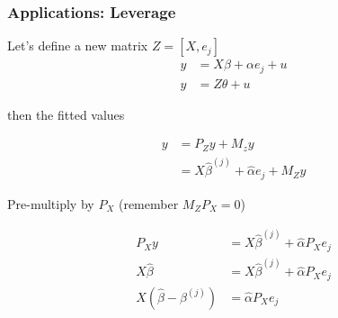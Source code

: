 \documentclass[
  shownotes,
  xcolor={svgnames},
  hyperref={colorlinks,citecolor=DarkBlue,linkcolor=DarkRed,urlcolor=DarkBlue}
  ]{beamer}
\begin{document}
\begin{frame}
\frametitle{Applications: Leverage}
Let's define a new matrix $Z=[X,e_j]$
\begin{align}
y &= X\beta+\alpha e_j +u \\
y &= Z\theta +u
\end{align}

then the fitted values 

\begin{align}
y &= P_Z y + M_zy  \\
&= X\hat \beta^{(j)} + \hat \alpha e_j + M_Z y
\end{align}

Pre-multiply by $P_X$ (remember $M_Z P_X=0$) 

\begin{align}
P_X y &= X\hat \beta^{(j)} + \hat \alpha P_X e_j \\
X \hat \beta  &= X\hat \beta^{(j)} + \hat \alpha P_X e_j \\
X (\hat \beta  -  \beta^{(j)} )&= \hat \alpha P_X e_j 
\end{align}
\end{frame}
\end{document}
